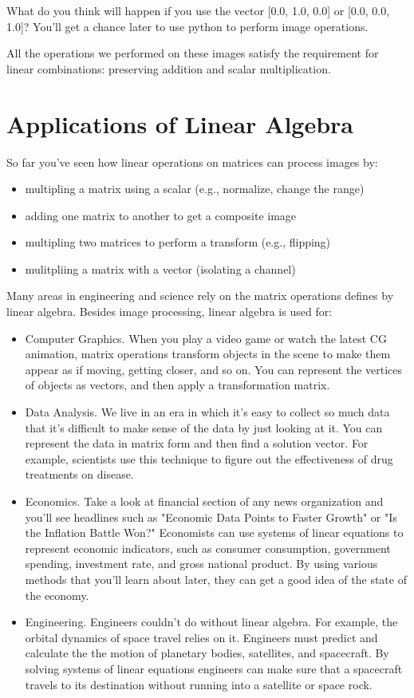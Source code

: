 What do you think will happen if you use the vector [0.0, 1.0, 0.0] or [0.0, 0.0, 1.0]? You'll get a chance later to use python to perform image operations.

All the operations we performed on these images satisfy the requirement for linear combinations: preserving addition and scalar multiplication. 


\section{Applications of Linear Algebra}

So far you've seen how linear operations on matrices can process images by:
\begin{itemize}
\item multipling a matrix using a scalar (e.g., normalize, change the range)
\item adding one matrix to another to get a composite image 
\item multipling two matrices to perform a transform (e.g., flipping)
\item mulitpliing a matrix with a vector (isolating a channel)
\end{itemize}

Many areas in engineering and science rely on the matrix operations defines by linear algebra. Besides image processing, linear algebra is used for: 
\begin{itemize}
\item Computer Graphics. When you play a video game or watch the latest CG animation, matrix operations transform objects in the scene to make them appear as if moving, getting closer, and so on. You can represent the vertices of objects as vectors, and then apply a transformation matrix.
\item Data Analysis. We live in an era in which it's easy to collect so much data that it's difficult to make sense of the data by just looking at it. You can represent the data in matrix form and then find a solution vector. For example, scientists use this technique to figure out the effectiveness of drug treatments on disease.
\item Economics. Take a look at financial section of any news organization and you'll see headlines such as "Economic Data Points to Faster Growth" or "Is the Inflation Battle Won?" Economists can use systems of linear equations to represent economic indicators, such as consumer consumption, government spending, investment rate, and gross national product. By using various methods that you'll learn about later, they can get a good idea of the state of the economy.
\item Engineering. Engineers couldn't do without linear algebra. For example, the orbital dynamics of space travel relies on it. Engineers must predict and calculate the the motion of planetary bodies, satellites, and spacecraft. By solving systems of linear equations engineers can make sure that a spacecraft travels to its destination without running into a satellite or space rock.
\end{itemize}

